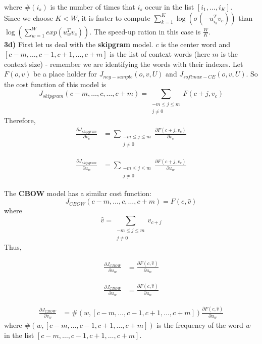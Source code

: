 \documentclass{article}
\begin{document}
where $\#(i_s)$ is the number of times that $i_s$ occur in the list $[i_{1}, \dots, i_{K}]$.\\

Since we choose $K < W$, it is faster to compute $\sum_{k=1}^{K} \log(\sigma(-u_{i_{k}}^{T}v_{c}))$ than $\log(\sum_{w=1}^{W}exp(u_{w}^{T}v_{c}))$. The speed-up ration in this case is $\frac{W}{K}$.\\

\textbf{3d)} First let us deal with the \textbf{skipgram} model. $c$ is the center word and $[c-m, \dots,c-1, c+1, \dots,c+m]$ is the list of context words (here $m$ is the context size) - remember we are identifying the words with their indexes. Let $F(o,v)$ be a place holder for $J_{neg - sample}(o,v,U)$ and $J_{softmax - CE}(o,v,U)$. So the cost function of this model is
\[
J_{skipgram}(c-m, \dots,c,\dots, c+m) = \sum_{\substack{-m \leq j \leq m \\ j\neq 0}}F(c+j, v_c)
\]
Therefore, 
\begin{align*}
\frac{\partial J_{skipgram}}{\partial v_{c}}  & = \sum_{\substack{-m \leq j \leq m \\ j\neq 0}}\frac{\partial F(c+j,v_c)}{\partial v_{c}} 
\end{align*}

\begin{align*}
\frac{\partial J_{skipgram}}{\partial u_{w}}  & = \sum_{\substack{-m \leq j \leq m \\ j\neq 0}}\frac{\partial F(c+j,v_c)}{\partial u_{w}} 
\end{align*}

The \textbf{CBOW} model has a similar cost function:
\[
J_{CBOW}(c-m, \dots,c,\dots, c+m) = F(c, \hat{v})
\]
where 
\[
\hat{v} = \sum_{\substack{-m \leq j \leq m \\ j\neq 0}}v_{c+j}
\]
Thus,

\begin{align*}
\frac{\partial J_{CBOW}}{\partial u_{w}}  & = \frac{\partial F(c, \hat{v})}{\partial u_{w}} 
\end{align*}

\begin{align*}
\frac{\partial J_{CBOW}}{\partial u_{w}}  & = \frac{\partial F(c, \hat{v})}{\partial u_{w}} 
\end{align*}

\begin{align*}
\frac{\partial J_{CBOW}}{\partial v_{w}}  & = \#(w,[c-m, \dots,c-1, c+1, \dots,c+m])\frac{\partial F(c, \hat{v})}{\partial u_{w}} 
\end{align*}
where $\#(w,[c-m, \dots,c-1, c+1, \dots,c+m])$ is the frequency of the word $w$ in the list $[c-m, \dots,c-1, c+1, \dots,c+m]$.
\end{document}
